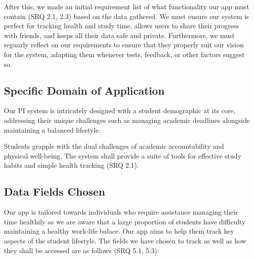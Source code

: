 \documentclass[12pt]{article}
\begin{document}
After this, we made an initial requirement list of what functionality our app must contain (SRQ 2.1, 2.3)
based on the data gathered. We must ensure our system is perfect for tracking
health and study time, allows users to share their progress with friends, and
keeps all their data safe and private. Furthermore, we must reguarly reflect on our requirements
to ensure that they properly suit our vision for the system, adapting them whenever tests, feedback, or other factors suggest so.
 

\subsection{Specific Domain of Application}

Our PI system is intricately designed with a student demographic at its core,
addressing their unique challenges such as managing academic deadlines
alongside maintaining a balanced lifestyle.\par 

Students grapple with the dual challenges of academic accountability and
physical well-being. The system shall provide a suite of tools for effective
study habits and simple health tracking (SRQ 2.1).
 

\subsection{Data Fields Chosen}

Our app is tailored towards individuals who require assistance managing their time healthily as
we are aware that a large proportion of students have difficulty maintaining a healthy work-life
balace. Our app aims to help them track key aspects of the student lifestyle.
The fields we have chosen to track as well as how they shall be accessed are as follows (SRQ 5.1, 5.3):
\end{document}
